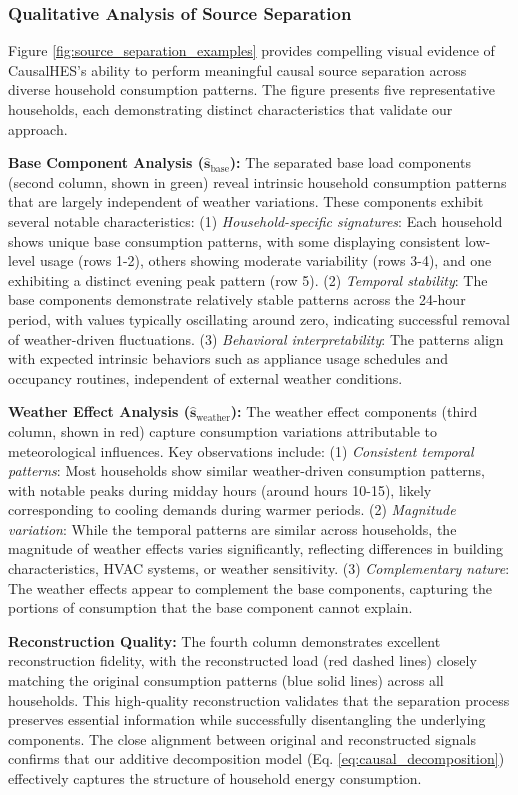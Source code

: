 \documentclass[journal]{IEEEtran}
\begin{document}
\subsubsection{Qualitative Analysis of Source Separation}
Figure \ref{fig:source_separation_examples} provides compelling visual evidence of CausalHES's ability to perform meaningful causal source separation across diverse household consumption patterns. The figure presents five representative households, each demonstrating distinct characteristics that validate our approach.

\textbf{Base Component Analysis ($\hat{\mathbf{s}}_{\text{base}}$):} The separated base load components (second column, shown in green) reveal intrinsic household consumption patterns that are largely independent of weather variations. These components exhibit several notable characteristics: (1) \textit{Household-specific signatures}: Each household shows unique base consumption patterns, with some displaying consistent low-level usage (rows 1-2), others showing moderate variability (rows 3-4), and one exhibiting a distinct evening peak pattern (row 5). (2) \textit{Temporal stability}: The base components demonstrate relatively stable patterns across the 24-hour period, with values typically oscillating around zero, indicating successful removal of weather-driven fluctuations. (3) \textit{Behavioral interpretability}: The patterns align with expected intrinsic behaviors such as appliance usage schedules and occupancy routines, independent of external weather conditions.

\textbf{Weather Effect Analysis ($\hat{\mathbf{s}}_{\text{weather}}$):} The weather effect components (third column, shown in red) capture consumption variations attributable to meteorological influences. Key observations include: (1) \textit{Consistent temporal patterns}: Most households show similar weather-driven consumption patterns, with notable peaks during midday hours (around hours 10-15), likely corresponding to cooling demands during warmer periods. (2) \textit{Magnitude variation}: While the temporal patterns are similar across households, the magnitude of weather effects varies significantly, reflecting differences in building characteristics, HVAC systems, or weather sensitivity. (3) \textit{Complementary nature}: The weather effects appear to complement the base components, capturing the portions of consumption that the base component cannot explain.

\textbf{Reconstruction Quality:} The fourth column demonstrates excellent reconstruction fidelity, with the reconstructed load (red dashed lines) closely matching the original consumption patterns (blue solid lines) across all households. This high-quality reconstruction validates that the separation process preserves essential information while successfully disentangling the underlying components. The close alignment between original and reconstructed signals confirms that our additive decomposition model (Eq. \ref{eq:causal_decomposition}) effectively captures the structure of household energy consumption.
\end{document}
